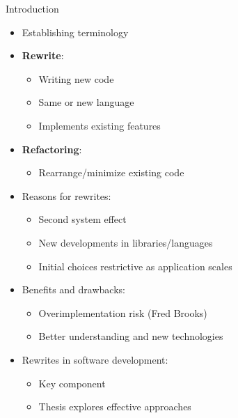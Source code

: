 \begin{frame}{Introduction}
    \begin{itemize}
        \item Establishing terminology
        \pause
        \item \textbf{Rewrite}:
        \begin{itemize}
            \item Writing new code
            \item Same or new language
            \item Implements existing features
        \end{itemize}
        \pause
        \item \textbf{Refactoring}:
        \begin{itemize}
            \item Rearrange/minimize existing code
        \end{itemize}
        \pause
        \item Reasons for rewrites:
        \begin{itemize}
            \item Second system effect
            \item New developments in libraries/languages
            \item Initial choices restrictive as application scales
        \end{itemize}
        \pause
        \item Benefits and drawbacks:
        \begin{itemize}
            \item Overimplementation risk (Fred Brooks)
            \item Better understanding and new technologies
        \end{itemize}
        \pause
        \item Rewrites in software development:
        \begin{itemize}
            \item Key component
            \item Thesis explores effective approaches
        \end{itemize}
    \end{itemize}
\end{frame}